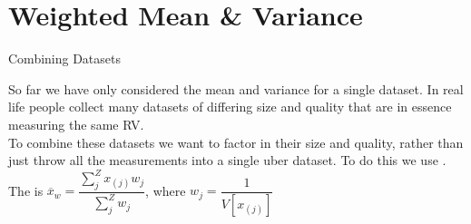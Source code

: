 \documentclass[10pt,sans,english,compress,xcolor=dvipsnames]{beamer}
\begin{document}
%
%
%


\section*{Weighted Mean \& Variance}


\begin{frame}[fragile]{Combining Datasets}

So far we have only considered the mean and variance for a single dataset. In real life people collect many datasets of differing size and quality that are in essence measuring the same RV.\\[1ex]

To combine these datasets we want to factor in their size and quality, rather than just throw all the measurements into a single uber dataset. To do this we use .\\[1ex]

The  is  $\overline{x}_w = \dfrac{\sum\limits_j^Z x_{(j)} w_j}{\sum\limits_j^Z w_j }$, where $w_j = \dfrac{1}{V[x_{(j)}]}$\\[1ex]



\end{frame}
\end{document}
